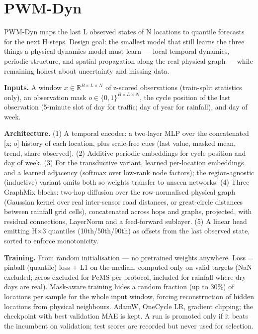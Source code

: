 \documentclass[
  10pt,
]{article}
\begin{document}
\section{PWM-Dyn}

PWM-Dyn maps the last L observed states of N locations to quantile
forecasts for the next H steps. Design goal: the smallest model that
still learns the three things a physical dynamics model must learn ---
local temporal dynamics, periodic structure, and spatial propagation
along the real physical graph --- while remaining honest about
uncertainty and missing data.

\textbf{Inputs.} A window \(x \in \mathbb{R}^{B \times L \times N}\) of
z-scored observations (train-split statistics only), an observation mask
\(o \in \{0,1\}^{B \times L \times N}\), the cycle position of the last
observation (5-minute slot of day for traffic; day of year for
rainfall), and day of week.

\textbf{Architecture.} (1) A temporal encoder: a two-layer MLP over the
concatenated {[}x; o{]} history of each location, plus scale-free cues
(last value, masked mean, trend, share observed). (2) Additive periodic
embeddings for cycle position and day of week. (3) For the transductive
variant, learned per-location embeddings and a learned adjacency
(softmax over low-rank node factors); the region-agnostic (inductive)
variant omits both so weights transfer to unseen networks. (4) Three
GraphMix blocks: two-hop diffusion over the row-normalised physical
graph (Gaussian kernel over real inter-sensor road distances, or
great-circle distances between rainfall grid cells), concatenated across
hops and graphs, projected, with residual connections, LayerNorm and a
feed-forward sublayer. (5) A linear head emitting H×3 quantiles
(10th/50th/90th) as offsets from the last observed state, sorted to
enforce monotonicity.

\textbf{Training.} From random initialisation --- no pretrained weights
anywhere. Loss = pinball (quantile) loss + L1 on the median, computed
only on valid targets (NaN excluded; zeros excluded for PeMS per
protocol, included for rainfall where dry days are real). Mask-aware
training hides a random fraction (up to 30\%) of locations per sample
for the whole input window, forcing reconstruction of hidden locations
from physical neighbours. AdamW, OneCycle LR, gradient clipping; the
checkpoint with best validation MAE is kept. A run is promoted only if
it beats the incumbent on validation; test scores are recorded but never
used for selection.
\end{document}
